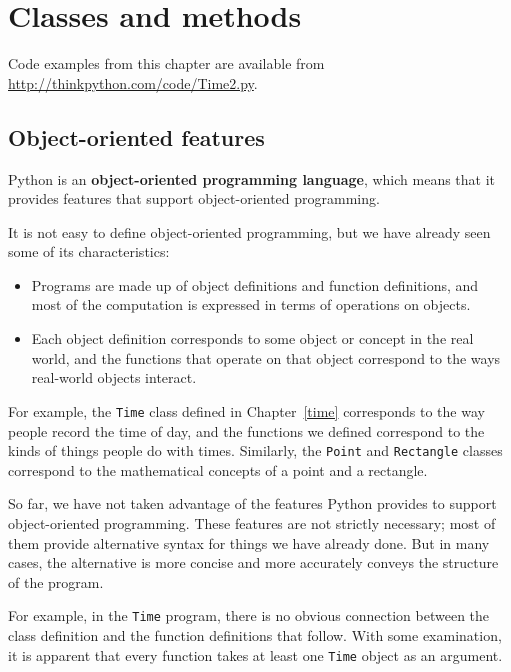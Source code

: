 \documentclass[10pt]{book}
\begin{document}
\chapter{Classes and methods}

Code examples from this chapter are available from
\url{http://thinkpython.com/code/Time2.py}.

\section{Object-oriented features}

Python is an {\bf object-oriented programming language}, which means
that it provides features that support object-oriented
programming.

It is not easy to define object-oriented programming, but we have
already seen some of its characteristics:

\begin{itemize}

\item Programs are made up of object definitions and function
definitions, and most of the computation is expressed in terms
of operations on objects.

\item Each object definition corresponds to some object or concept
in the real world, and the functions that operate on that object
correspond to the ways real-world objects interact.

\end{itemize}

For example, the {\tt Time} class defined in Chapter~\ref{time}
corresponds to the way people record the time of day, and the
functions we defined correspond to the kinds of things people do with
times.  Similarly, the {\tt Point} and {\tt Rectangle} classes
correspond to the mathematical concepts of a point and a rectangle.

So far, we have not taken advantage of the features Python provides to
support object-oriented programming.  These
features are not strictly necessary; most of them provide
alternative syntax for things we have already done.  But in many cases,
the alternative is more concise and more accurately conveys the
structure of the program.

For example, in the {\tt Time} program, there is no obvious
connection between the class definition and the function definitions
that follow.  With some examination, it is apparent that every function
takes at least one {\tt Time} object as an argument.
\end{document}

